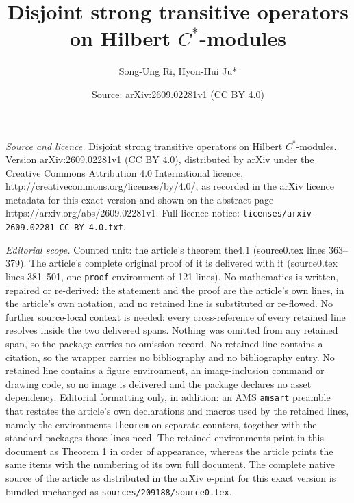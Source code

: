 \documentclass[10pt,a4paper]{amsart}
\title{Disjoint strong transitive operators on Hilbert $C^{\ast}$-modules}
\author{Song-Ung Ri, Hyon-Hui Ju*}
\date{Source: arXiv:2609.02281v1 (CC BY 4.0)}
\begin{document}
\maketitle

\noindent\emph{Source and licence.} Disjoint strong transitive operators on Hilbert $C^{\ast}$-modules. Version arXiv:2609.02281v1 (CC BY 4.0), distributed by arXiv under the Creative Commons Attribution 4.0 International licence, http://creativecommons.org/licenses/by/4.0/, as recorded in the arXiv licence metadata for this exact version and shown on the abstract page https://arxiv.org/abs/2609.02281v1. Full licence notice: \texttt{licenses/arxiv-2609.02281-CC-BY-4.0.txt}.\par\smallskip

\noindent\textit{Editorial scope.} Counted unit: the article's theorem the4.1 (source0.tex lines 363--379). The article's complete original proof of it is delivered with it (source0.tex lines 381--501, one \texttt{proof} environment of 121 lines). No mathematics is written, repaired or re-derived: the statement and the proof are the article's own lines, in the article's own notation, and no retained line is substituted or re-flowed.  No further source-local context is needed: every cross-reference of every retained line resolves inside the two delivered spans.  Nothing was omitted from any retained span, so the package carries no omission record.  No retained line contains a citation, so the wrapper carries no bibliography and no bibliography entry.  No retained line contains a figure environment, an image-inclusion command or drawing code, so no image is delivered and the package declares no asset dependency.  Editorial formatting only, in addition: an AMS \texttt{amsart} preamble that restates the article's own declarations and macros used by the retained lines, namely the environments \texttt{theorem} on separate counters, together with the standard packages those lines need.  The retained environments print in this document as Theorem 1 in order of appearance, whereas the article prints the same items with the numbering of its own full document.  The complete native source of the article as distributed in the arXiv e-print for this exact version is bundled unchanged as \texttt{sources/209188/source0.tex}.
\end{document}
